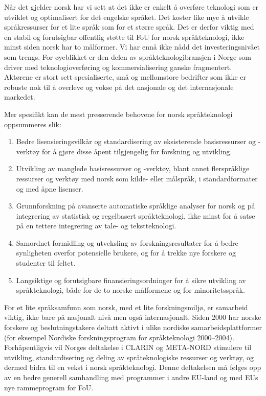 \begin{multicols}{2}
Når det gjelder norsk har vi sett at det ikke er enkelt å overføre teknologi som er utviklet og optimalisert for det engelske språket. 
Det koster like mye å utvikle språkressurser for et lite språk som for et større språk. Det er derfor viktig med en stabil og forutsigbar offentlig støtte til FoU for norsk språkteknologi, ikke minst siden norsk har to målformer. 
Vi har ennå ikke nådd det investeringsnivået som trengs. For øyeblikket er den delen av språkteknologibransjen i Norge som driver med teknologioverføring og kommersialisering ganske fragmentert. Aktørene er stort sett spesialiserte, små og mellomstore bedrifter som ikke er robuste nok til å overleve og vokse på det nasjonale og det internasjonale markedet.

Mer spesifikt kan de mest presserende behovene for norsk språkteknologi oppsummeres slik:
\begin{enumerate}
\item Bedre lisensieringsvilkår og standardisering av eksisterende basisressurser og -verktøy for å gjøre disse åpent tilgjengelig for forskning og utvikling.
\item Utvikling av manglede basisressurser og -verktøy, blant annet flerspråklige ressurser og verktøy med norsk som kilde- eller målspråk, i standardformater og med åpne lisenser.
\item Grunnforskning på avanserte automatiske språklige analyser for norsk og på integrering av statistisk og regelbasert språkteknologi, ikke minst for å satse på en tettere integrering av tale- og tekstteknologi.
\item Samordnet formidling og utveksling av forskningsresultater for å bedre synligheten overfor potensielle brukere, og for å trekke nye forskere og studenter til feltet.
\item Langsiktige og forutsigbare finansieringsordninger for å sikre utvikling av språkteknologi, både for de to norske målformene og for minoritetsspråk.
\end{enumerate}

For et lite språksamfunn som norsk, med et lite forskningsmiljø, er samarbeid viktig, ikke bare på nasjonalt nivå men også internasjonalt. Siden 2000 har norske forskere og beslutningstakere deltatt aktivt i ulike nordiske samarbeidsplattformer  (for eksempel Nordiske forskningsprogram for språkteknologi 2000--2004). Forhåpentligvis vil Norges deltakelse i CLARIN og META-NORD stimulere til utvikling, standardisering og deling av språteknologiske ressurser og verktøy, og dermed bidra til en vekst i norsk språkteknologi.
Denne deltakelsen må følges opp av en bedre generell samhandling med programmer i andre EU-land og med EUs nye rammeprogram for FoU.


\end{multicols}
